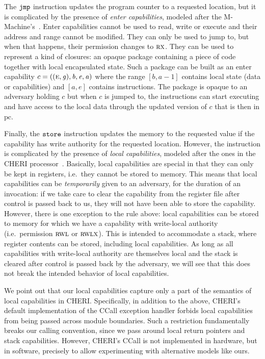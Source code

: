 \documentclass[format=acmsmall, review=false, screen=true]{acmart}
\newcommand\lau[1]{{\color{purple} \sf \footnotesize {LS: #1}}\\}
\renewcommand\lau[1]{}
\newcommand{\var}[1]{\mathit{#1}}
\newcommand{\gl}{\var{g}}
\newcommand{\pcreg}{\mathrm{pc}}
\newcommand{\addr}{\var{a}}
\newcommand{\start}{\var{b}}
\newcommand{\addrend}{\var{e}}
\newcommand{\zinstr}[1]{\mathtt{#1}}
\newcommand{\oneinstr}[2]{
  \ifthenelse{\equal{#2}{}}
  {\zinstr{#1}}
  {\zinstr{#1} \; #2}
}
\newcommand{\jmp}[1]{\oneinstr{jmp}{#1}}
\newcommand{\twoinstr}[3]{
  \ifthenelse{\equal{#2#3}{}}
  {\zinstr{#1}}
  {\zinstr{#1} \; #2 \; #3}
}
\newcommand{\store}[2]{\twoinstr{store}{#1}{#2}}
\newcommand{\plainperm}[1]{\textsc{#1}}
\newcommand{\exec}{\plainperm{rx}}
\newcommand{\entry}{\plainperm{e}}
\newcommand{\readwritel}{\plainperm{rwl}}
\newcommand{\rwl}{\readwritel}
\newcommand{\rwlx}{\plainperm{rwlx}}
\begin{document}
The $\jmp{}$ instruction updates the program counter to a requested location,
but it is complicated by the presence of \emph{enter capabilities}, modeled
after the M-Machine's~\citep{Carter:1994:HSF:195473.195579}. Enter capabilities
cannot be used to read, write or execute and their address and range cannot be
modified. They can only be used to jump to, but when that happens, their
permission changes to $\exec$. They can be used to represent a kind of closures:
an opaque package containing a piece of code together with local encapsulated
state. Such a package can be built as an enter capability $c =
((\entry,\gl),\start,\addrend,\addr)$ where the range $[\start,\addr-1]$
contains local state (data or capabilities) and $[\addr,\addrend]$ contains
instructions. The package is opaque to an adversary holding $c$ but when $c$ is
jumped to, the instructions can start executing and have access to the local
data through the updated version of $c$ that is then in $\pcreg$. 
\lau{As we talked about what is described here, is not how we make closures in
the TR, so we should consider whether we should refrain from using that word
here. }

Finally, the $\store{}{}$ instruction updates the memory to the requested value
if the capability has write authority for the requested location. However, the
instruction is complicated by the presence of \emph{local capabilities}, modeled
after the ones in the CHERI processor~\citep{Watson2015Cheri}. Basically, local
capabilities are special in that they can only be kept in registers, i.e.\ they
cannot be stored to memory. This means that local capabilities can be
\emph{temporarily} given to an adversary, for the duration of an invocation: if
we take care to clear the capability from the register file after control is
passed back to us, they will not have been able to store the capability.
However, there is one exception to the rule above: local capabilities can be
stored to memory for which we have a capability with write-local authority
(i.e.\ permission $\rwl$ or $\rwlx$). This is intended to accommodate a stack,
where register contents can be stored, including local capabilities. As long as
all capabilities with write-local authority are themselves local and the stack
is cleared after control is passed back by the adversary, we will see that this
does not break the intended behavior of local capabilities.

We point out that our local capabilities capture only a part of the semantics of
local capabilities in CHERI. Specifically, in addition to the above, CHERI's
default implementation of the CCall exception handler forbids local capabilities
from being passed across module boundaries. Such a restriction fundamentally
breaks our calling convention, since we pass around local return pointers and
stack capabilities. However, CHERI's CCall is not implemented in hardware, but
in software, precisely to allow experimenting with alternative models like ours.
\end{document}
